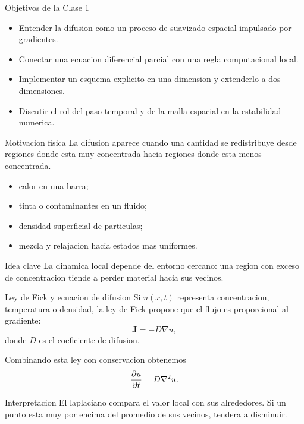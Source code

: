 \begin{frame}{Objetivos de la Clase 1}
\begin{itemize}
    \item Entender la difusion como un proceso de suavizado espacial impulsado por gradientes.
    \item Conectar una ecuacion diferencial parcial con una regla computacional local.
    \item Implementar un esquema explicito en una dimension y extenderlo a dos dimensiones.
    \item Discutir el rol del paso temporal y de la malla espacial en la estabilidad numerica.
\end{itemize}
\end{frame}

\begin{frame}{Motivacion fisica}
\justifying
La difusion aparece cuando una cantidad se redistribuye desde regiones donde esta muy concentrada hacia regiones donde esta menos concentrada.

\begin{itemize}
    \item calor en una barra;
    \item tinta o contaminantes en un fluido;
    \item densidad superficial de particulas;
    \item mezcla y relajacion hacia estados mas uniformes.
\end{itemize}

\begin{alertblock}{Idea clave}
La dinamica local depende del entorno cercano: una region con exceso de concentracion tiende a perder material hacia sus vecinos.
\end{alertblock}
\end{frame}

\begin{frame}{Ley de Fick y ecuacion de difusion}
\justifying
Si $u(x,t)$ representa concentracion, temperatura o densidad, la ley de Fick propone que el flujo es proporcional al gradiente:
\[
\bm{J} = -D \nabla u,
\]
donde $D$ es el coeficiente de difusion.

Combinando esta ley con conservacion obtenemos
\[
\pdv{u}{t} = D \nabla^2 u.
\]

\begin{block}{Interpretacion}
El laplaciano compara el valor local con sus alrededores. Si un punto esta muy por encima del promedio de sus vecinos, tendera a disminuir.
\end{block}
\end{frame}

